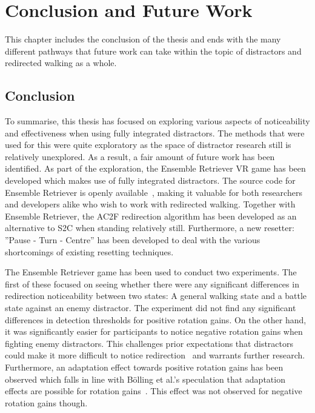\chapter{Conclusion and Future Work}\label{chap:conclusion}
This chapter includes the conclusion of the thesis and ends with the many different pathways that future work can take within the topic of distractors and redirected walking as a whole. 

\section{Conclusion}
To summarise, this thesis has focused on exploring various aspects of noticeability and effectiveness when using fully integrated distractors. The methods that were used for this were quite exploratory as the space of distractor research still is relatively unexplored. As a result, a fair amount of future work has been identified. As part of the exploration, the Ensemble Retriever VR game has been developed which makes use of fully integrated distractors. The source code for Ensemble Retriever is openly available~\cite{projectRepository}, making it valuable for both researchers and developers alike who wish to work with redirected walking. Together with Ensemble Retriever, the AC2F redirection algorithm has been developed as an alternative to S2C when standing relatively still. Furthermore, a new resetter: ''Pause - Turn - Centre'' has been developed to deal with the various shortcomings of existing resetting techniques. 

The Ensemble Retriever game has been used to conduct two experiments. The first of these focused on seeing whether there were any significant differences in redirection noticeability between two states: A general walking state and a battle state against an enemy distractor. The experiment did not find any significant differences in detection thresholds for positive rotation gains. On the other hand, it was significantly easier for participants to notice negative rotation gains when fighting enemy distractors. This challenges prior expectations that distractors could make it more difficult to notice redirection~\cite{5072212, schmitz2018you, sra2018vmotion} and warrants further research. Furthermore, an adaptation effect towards positive rotation gains has been observed which falls in line with B{\"o}lling et al.'s speculation that adaptation effects are possible for rotation gains~\cite{bolling2019shrinking}. This effect was not observed for negative rotation gains though. 

